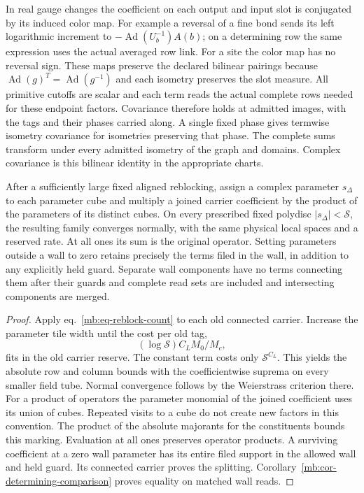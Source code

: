 \documentclass[11pt,letterpaper,reqno]{amsart}
\makeatletter
\numberwithin{equation}{section}
\renewcommand{\eqref}[1]{\textup{eq.~\ref{#1}}}
\theoremstyle{definition}
\newcommand{\ms@majorstart}{%
  \pushQED{\qed}\renewcommand{\qedsymbol}{$\blacksquare\square$}}
\newenvironment{corollary}[1][]{\ms@majorstart\ms@corollary[#1]}
  {\popQED\endms@corollary}
\theoremstyle{remark}
\makeatother
\begin{document}
In real gauge changes the coefficient on each output and input slot is conjugated by its induced color map. For example a reversal of a fine bond sends its left logarithmic increment to \(-\operatorname{Ad}(U_b^{-1})A(b)\); on a determining row the same expression uses the actual averaged row link. For a site the color map has no reversal sign. These maps preserve the declared bilinear pairings because \(\operatorname{Ad}(g)^T=\operatorname{Ad}(g^{-1})\) and each isometry preserves the slot measure. All primitive cutoffs are scalar and each term reads the actual complete rows needed for these endpoint factors. Covariance therefore holds at admitted images, with the tags and their phases carried along. A single fixed phase gives termwise isometry covariance for isometries preserving that phase. The complete sums transform under every admitted isometry of the graph and domains. Complex covariance is this bilinear identity in the appropriate charts.

\begin{corollary}[Independent carrier parameters]
\label{mb:cor-carrier-parameters}
After a sufficiently large fixed aligned reblocking, assign a complex parameter \(s_\Delta\) to each parameter cube and multiply a joined carrier coefficient by the product of the parameters of its distinct cubes. On every prescribed fixed polydisc \(|s_\Delta|<\mathcal S\), the resulting family converges normally, with the same physical local spaces and a reserved rate. At all ones its sum is the original operator. Setting parameters outside a wall to zero retains precisely the terms filed in the wall, in addition to any explicitly held guard. Separate wall components have no terms connecting them after their guards and complete read sets are included and intersecting components are merged.
\end{corollary}

\begin{proof}
Apply \eqref{mb:eq-reblock-count} to each old connected carrier.
Increase the parameter tile width until the cost per old tag,
\[
                    (\log\mathcal S)C_L M_0/M_c,
\]
fits in the old carrier reserve. The constant term costs only \(\mathcal S^{C_L}\). This yields the absolute row and column bounds with the coefficientwise suprema on every smaller field tube. Normal convergence follows by the Weierstrass criterion there. For a product of operators the parameter monomial of the joined coefficient uses its union of cubes. Repeated visits to a cube do not create new factors in this convention. The product of the absolute majorants for the constituents bounds this marking. Evaluation at all ones preserves operator products. A surviving coefficient at a zero wall parameter has its entire filed support in the allowed wall and held guard. Its connected carrier proves the splitting. Corollary~\ref{mb:cor-determining-comparison} proves equality on matched wall reads.
\end{proof}
\end{document}
